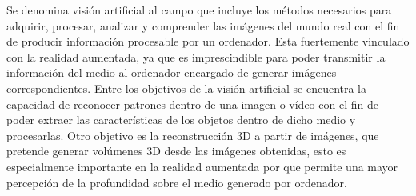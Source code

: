 Se denomina visión artificial al campo que incluye los métodos necesarios para adquirir, procesar, analizar y comprender las imágenes del mundo real con el fin de producir información procesable por un ordenador. Esta fuertemente vinculado con la realidad aumentada, ya que es imprescindible para poder transmitir la información del medio al ordenador encargado de generar imágenes correspondientes. 
Entre los objetivos de la visión artificial se encuentra la capacidad de reconocer patrones dentro de una imagen o vídeo con el fin de poder extraer las características de los objetos dentro de dicho medio y  procesarlas. 
Otro objetivo es la reconstrucción 3D a partir de imágenes, que pretende generar volúmenes 3D desde las imágenes obtenidas, esto es especialmente importante en la realidad aumentada por que permite una mayor percepción de la profundidad sobre el medio generado por ordenador.